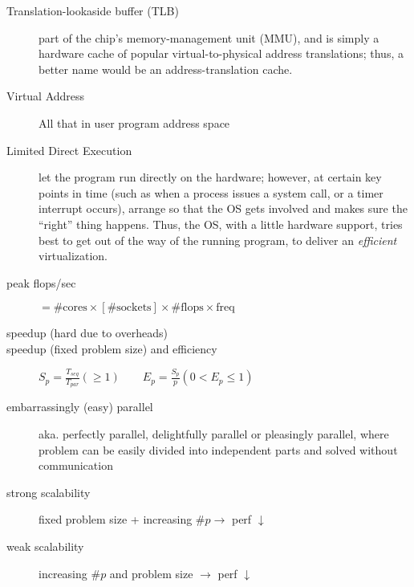\begin{description}
\item[Translation-lookaside buffer (TLB)] part of the chip’s memory-management unit (MMU), and is simply a hardware cache of popular virtual-to-physical address translations; thus, a better name would be an address-translation cache.

\item[Virtual Address] All that in user program address space

\item[Limited Direct Execution] let the program run directly on the hardware; however, at certain key points in time (such as when a process issues a system call, or a timer interrupt occurs), arrange so that the OS gets involved and makes sure the “right” thing happens.   Thus, the OS, with a little hardware support, tries best to get out of the way of the running program, to deliver an \emph{efficient} virtualization.

\item[peak flops/sec] $ = \# \text{cores} \times [\# \text{sockets}] \times \# \text{flops} \times \text{freq}$

\item[speedup (hard due to overheads)]

\item[speedup (fixed problem size) and efficiency] $S_p = \frac{T_{seq}}{T_{par}} (\geq 1)\qquad E_p = \frac{S_{p}}{p} (0 < E_p \leq 1)$


\item[embarrassingly (easy) parallel] aka. perfectly parallel, delightfully parallel or pleasingly parallel, where problem can be easily divided into independent parts and solved without communication

\item[strong scalability] fixed problem size + increasing $\# p \rightarrow$ perf $\downarrow$

\item[weak scalability] increasing $\# p$ and problem size $\rightarrow$ perf $\downarrow$


\end{description}
